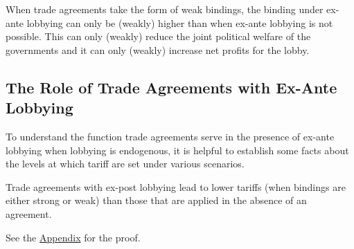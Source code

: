 \begin{result}
	When trade agreements take the form of weak bindings, the binding under ex-ante lobbying can only be (weakly) higher than when ex-ante lobbying is not possible. This can only (weakly) reduce the joint political welfare of the governments and it can only (weakly) increase net profits for the lobby.
\end{result}

\subsection{The Role of Trade Agreements with Ex-Ante Lobbying}				
To understand the function trade agreements serve in the presence of ex-ante lobbying when lobbying is endogenous, it is helpful to establish some facts about the levels at which tariff are set under various scenarios.

\begin{lemma}
  Trade agreements with ex-post lobbying lead to lower tariffs (when bindings are either strong or weak) than those that are applied in the absence of an agreement.
	\label{lem:1}
\end{lemma}

See the \hyperlink{lem1}{Appendix} for the proof.


